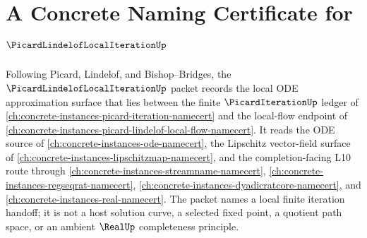 \chapter{A Concrete Naming Certificate for $\PicardLindelofLocalIterationUp$}
\label{ch:concrete-instances-picard-lindelof-local-iteration-namecert}

Following Picard, Lindelof, and Bishop--Bridges, the $\PicardLindelofLocalIterationUp$ packet records the local ODE approximation surface that lies between the finite $\PicardIterationUp$ ledger of \autoref{ch:concrete-instances-picard-iteration-namecert} and the local-flow endpoint of \autoref{ch:concrete-instances-picard-lindelof-local-flow-namecert}. It reads the ODE source of \autoref{ch:concrete-instances-ode-namecert}, the Lipschitz vector-field surface of \autoref{ch:concrete-instances-lipschitzmap-namecert}, and the completion-facing L10 route through \autoref{ch:concrete-instances-streamname-namecert}, \autoref{ch:concrete-instances-regseqrat-namecert}, \autoref{ch:concrete-instances-dyadicratcore-namecert}, and \autoref{ch:concrete-instances-real-namecert}. The packet names a local finite iteration handoff; it is not a host solution curve, a selected fixed point, a quotient path space, or an ambient $\RealUp$ completeness principle.

